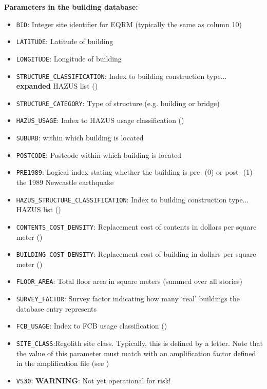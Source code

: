 \textbf{Parameters in the building database:}
\begin{itemize}
\item \texttt{BID}: Integer site identifier for EQRM (typically the same as column 10)
\item \texttt{LATITUDE}: Latitude of building
\item \texttt{LONGITUDE}: Longitude of building
\item \texttt{STRUCTURE\_CLASSIFICATION}: Index to building construction type... \textbf{expanded} HAZUS list ()
\item \texttt{STRUCTURE\_CATEGORY}: Type of structure (e.g. building or bridge)
\item \texttt{HAZUS\_USAGE}: Index to HAZUS usage classification ()
\item \texttt{SUBURB}: within which building is located
\item \texttt{POSTCODE}: Postcode within which building is located
\item \texttt{PRE1989}: Logical index stating whether the building is pre- (0) or post- (1) the 1989 Newcastle earthquake
\item \texttt{HAZUS\_STRUCTURE\_CLASSIFICATION}: Index to building construction type... HAZUS list ()
\item \texttt{CONTENTS\_COST\_DENSITY}: Replacement cost of contents in dollars per square meter ()
\item \texttt{BUILDING\_COST\_DENSITY}: Replacement cost of building in dollars per square meter ()
\item \texttt{FLOOR\_AREA}: Total floor area in square meters (summed over all stories)
\item \texttt{SURVEY\_FACTOR}: Survey factor indicating how many `real' buildings the database entry represents
\item \texttt{FCB\_USAGE}: Index to FCB usage classification ()
\item \texttt{SITE\_CLASS}:Regolith site class. Typically, this is defined
by a letter. Note that the value of this parameter must match with
an amplification factor defined in the amplification file (see
)
\item \texttt{VS30}: \textbf{WARNING}: Not yet operational for risk!
\end{itemize}



